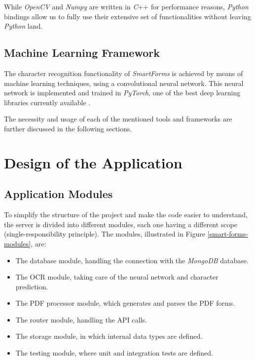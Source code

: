 \documentclass[11pt, a4paper]{report}
\begin{document}
While \textit{OpenCV} and \textit{Numpy} are written in \textit{C}++ for performance reasons, \textit{Python} bindings allow us to fully use their extensive set of functionalities without leaving \textit{Python} land.

\section{Machine Learning Framework}

The character recognition functionality of \textit{SmartForms} is achieved by means of machine learning techniques, using a convolutional neural network.
This neural network is implemented and trained in \textit{PyTorch}, one of the best deep learning libraries currently available \cite{pytorch}.

\vspace{1em}

The necessity and usage of each of the mentioned tools and frameworks are further discussed in the following sections.


\chapter{Design of the Application}
\label{chapter-design-of-the-application}

\section{Application Modules}

To simplify the structure of the project and make the code easier to understand, the server is divided into different modules, each one having a different scope (single-responsibility principle). The modules, illustrated in Figure \ref{smart-forms-modules}, are:
\begin{itemize}
    \item The database module, handling the connection with the \textit{MongoDB} database.
    \item The OCR module, taking care of the neural network and character prediction.
    \item The PDF processor module, which generates and parses the PDF forms.
    \item The router module, handling the API calls.
    \item The storage module, in which internal data types are defined.
    \item The testing module, where unit and integration tests are defined.
\end{itemize}
\end{document}
